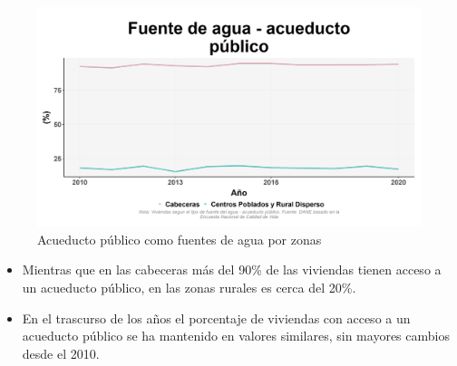     \begin{figure}[H]
        \caption{Acueducto público como fuentes de agua por zonas \label{map_result_2} }
        \begin{center}
        \includegraphics[width=\textwidth,keepaspectratio]{img/var_130_trend.png}
        \end{center}
    \end{figure}
            \begin{itemize}
                    \item Mientras que en las cabeceras más del 90\% de las viviendas tienen acceso a un acueducto público, en las zonas rurales es cerca del 20\%.
                    \item En el trascurso de los años el porcentaje de viviendas con acceso a un acueducto público se ha mantenido en valores similares, sin mayores cambios desde el 2010.
                    \end{itemize}


